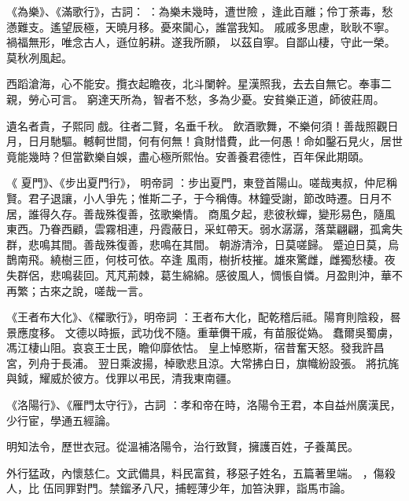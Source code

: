 \begin{pinyinscope}
《為樂》、《滿歌行》，古詞：
 ：為樂未幾時，遭世險𡾟，逢此百離；伶丁荼毒，愁懣難支。遙望辰極，天曉月移。憂來闐心，誰當我知。
 戚戚多思慮，耿耿不寧。禍福無形，唯念古人，遜位躬耕。遂我所願，
 以茲自寧。自鄙山棲，守此一榮。
 莫秋冽風起。


西蹈滄海，心不能安。攬衣起瞻夜，北斗闌幹。星漢照我，去去自無它。奉事二親，勞心可言。
 窮達天所為，智者不愁，多為少憂。安貧樂正道，師彼莊周。


遺名者貴，子熙同戲。往者二賢，名垂千秋。
 飲酒歌舞，不樂何須！善哉照觀日月，日月馳驅。轗軻世間，何有何無！貪財惜費，此一何愚！命如鑿石見火，居世竟能幾時？但當歡樂自娛，盡心極所熙怡。安善養君德性，百年保此期頤。




《
 夏門》、《步出夏門行》，
 明帝詞
 ：步出夏門，東登首陽山。嗟哉夷叔，仲尼稱賢。君子退讓，小人爭先；惟斯二子，于今稱傳。林鐘受謝，節改時遷。日月不居，誰得久存。善哉殊復善，弦歌樂情。
 商風夕起，悲彼秋蟬，變形易色，隨風東西。乃眷西顧，雲霧相連，丹霞蔽日，采虹帶天。弱水潺潺，落葉翩翩，孤禽失群，悲鳴其間。善哉殊復善，悲鳴在其間。
 朝游清泠，日莫嗟歸。
 蹙迫日莫，烏鵲南飛。繞樹三匝，何枝可依。卒逢
 風雨，樹折枝摧。雄來驚雌，雌獨愁棲。夜失群侶，悲鳴裴回。芃芃荊棘，葛生綿綿。感彼風人，惆悵自憐。月盈則沖，華不再繁；古來之說，嗟哉一言。


《王者布大化》、《櫂歌行》，明帝詞
 ：王者布大化，配乾稽后祗。陽育則陰殺，晷景應度移。
 文德以時振，武功伐不隨。重華儛干戚，有苗服從媯。
 蠢爾吳蜀虜，馮江棲山阻。哀哀王士民，瞻仰靡依怙。
 皇上悼愍斯，宿昔奮天怒。發我許昌宮，列舟于長浦。
  翌日乘波揚，棹歌悲且涼。大常拂白日，旗幟紛設張。
 將抗旄與鉞，耀威於彼方。伐罪以弔民，清我東南疆。


《洛陽行》、《雁門太守行》，古詞
 ：孝和帝在時，洛陽令王君，本自益州廣漢民，少行宦，學通五經論。


明知法令，歷世衣冠。從溫補洛陽令，治行致賢，擁護百姓，子養萬民。


外行猛政，內懷慈仁。文武備具，料民富貧，移惡子姓名，五篇著里端。
 ，傷殺人，比
 伍同罪對門。禁鎦矛八尺，捕輕薄少年，加笞決罪，詣馬市論。



\end{pinyinscope}
